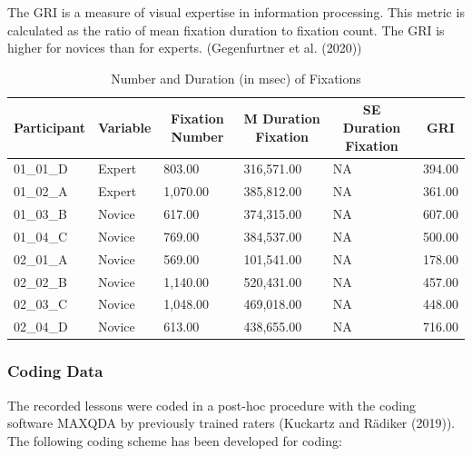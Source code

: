 \documentclass[
  english,
  man,floatsintext]{apa6}
\begin{document}
The GRI is a measure of visual expertise in information processing. This metric is calculated as the ratio of mean fixation duration to fixation count. The GRI is higher for novices than for experts. (Gegenfurtner et al. (2020))

\begin{table}[h]

\begin{center}
\begin{threeparttable}

\caption{\label{tab:GRItable}Number and Duration (in msec) of Fixations}

\small{

\begin{tabular}{llllll}
\toprule
Participant & \multicolumn{1}{c}{Variable} & \multicolumn{1}{c}{Fixation Number} & \multicolumn{1}{c}{M Duration Fixation} & \multicolumn{1}{c}{SE Duration Fixation} & \multicolumn{1}{c}{GRI}\\
\midrule
01\_01\_D & Expert & 803.00 & 316,571.00 & NA & 394.00\\
01\_02\_A & Expert & 1,070.00 & 385,812.00 & NA & 361.00\\
01\_03\_B & Novice & 617.00 & 374,315.00 & NA & 607.00\\
01\_04\_C & Novice & 769.00 & 384,537.00 & NA & 500.00\\
02\_01\_A & Novice & 569.00 & 101,541.00 & NA & 178.00\\
02\_02\_B & Novice & 1,140.00 & 520,431.00 & NA & 457.00\\
02\_03\_C & Novice & 1,048.00 & 469,018.00 & NA & 448.00\\
02\_04\_D & Novice & 613.00 & 438,655.00 & NA & 716.00\\
\bottomrule
\end{tabular}

}

\end{threeparttable}
\end{center}

\end{table}

\hypertarget{coding-data}{%
\subsubsection{Coding Data}\label{coding-data}}

The recorded lessons were coded in a post-hoc procedure with the coding software MAXQDA by previously trained raters (Kuckartz and Rädiker (2019)). The following coding scheme has been developed for coding:
\end{document}
